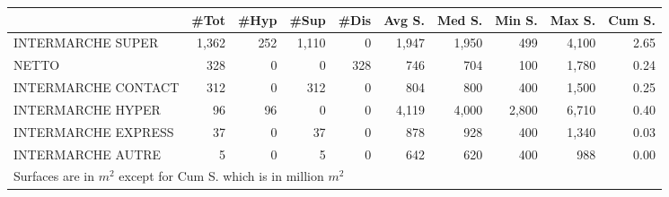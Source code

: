 \documentclass[11pt]{article}
\begin{document}
\begin{table}[H]
\footnotesize
\setlength{\tabcolsep}{2pt}

\begin{tabular}{lrrrrrrrrr}
\toprule
{} &       \#Tot &       \#Hyp &       \#Sup &       \#Dis &     Avg S. &     Med S. &     Min S. &     Max S. &     Cum S. \\
\midrule
INTERMARCHE SUPER   &      1,362 &        252 &      1,110 &          0 &      1,947 &      1,950 &        499 &      4,100 &       2.65 \\
NETTO               &        328 &          0 &          0 &        328 &        746 &        704 &        100 &      1,780 &       0.24 \\
INTERMARCHE CONTACT &        312 &          0 &        312 &          0 &        804 &        800 &        400 &      1,500 &       0.25 \\
INTERMARCHE HYPER   &         96 &         96 &          0 &          0 &      4,119 &      4,000 &      2,800 &      6,710 &       0.40 \\
INTERMARCHE EXPRESS &         37 &          0 &         37 &          0 &        878 &        928 &        400 &      1,340 &       0.03 \\
INTERMARCHE AUTRE   &          5 &          0 &          5 &          0 &        642 &        620 &        400 &        988 &       0.00 \\
\bottomrule
\multicolumn{10}{l}{\footnotesize Surfaces are in $m^2$ except for Cum S. which is in million $m^2$} \\
\end{tabular}

\end{table}
\end{document}

